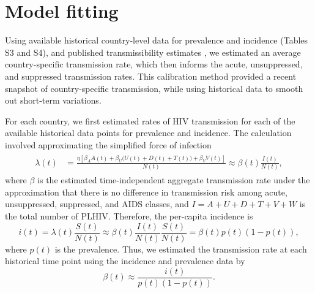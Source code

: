 \documentclass{article}
\begin{document}
\section{Model fitting}
\label{model_fitting}

Using available historical country-level data for prevalence and
incidence (Tables S3 and S4), and published transmissibility estimates
\cite{Wawer2005-us,Donnell2010-xo,Hughes2012-so,Skarbinski2015-ni}, we
estimated an average country-specific transmission rate, which then
informs the acute, unsuppressed, and suppressed transmission rates.
This calibration method provided a recent snapshot of country-specific
transmission, while using historical data to smooth out short-term
variations.

For each country, we first estimated rates of HIV transmission for
each of the available historical data points for prevalence and
incidence.  The calculation involved approximating the simplified
force of infection
\begin{align}
  \label{foi}
  \begin{split}
    \lambda(t) &= \frac{\eta \left[\beta_{A} A(t)
        + \beta_{U} \big(U(t) + D(t) + T(t)\big) +
        \beta_{V} V(t)\right]}{N(t)}
    \approx  \beta(t) \frac{I(t)}{N(t)},
  \end{split}
\end{align}
where $\beta$ is the estimated time-independent aggregate transmission
rate under the approximation that there is no difference in
transmission risk among acute, unsuppressed, suppressed, and AIDS
classes, and $I = A + U + D + T + V + W$ is the total number of
PLHIV.  Therefore, the per-capita incidence is
\begin{equation}
i(t) = \lambda(t) \frac{S(t)}{N(t)}
\approx \beta(t) \frac{I(t)}{N(t)} \frac{S(t)}{N(t)} =\beta(t) p(t) (1-p(t)),
\end{equation}
where $p(t)$ is the prevalence. Thus, we estimated the transmission
rate at each historical time point using the incidence and prevalence
data by
\begin{equation}
  \label{trans_rate}
  \beta(t) \approx \frac{i(t)}{p(t)(1-p(t))}.
\end{equation}
\end{document}

